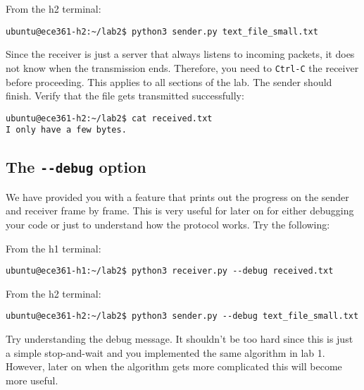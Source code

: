 \documentclass[11pt]{article}
\begin{document}
From the h2 terminal:
\begin{lstlisting}[style=ece361-shell-base, caption={}]
ubuntu@ece361-h2:~/lab2$ python3 sender.py text_file_small.txt
\end{lstlisting}

Since the receiver is just a server that always listens to incoming packets, it does not know when the transmission ends. Therefore, you need to \texttt{Ctrl-C} the receiver before proceeding. This applies to all sections of the lab.
The sender should finish. Verify that the file gets transmitted successfully:
\begin{lstlisting}[style=ece361-shell-base, caption={}]
ubuntu@ece361-h2:~/lab2$ cat received.txt
I only have a few bytes.
\end{lstlisting}


\subsection {The \texttt{-{}-debug} option}
We have provided you with a feature that prints out the progress on the sender and receiver frame by frame. This is very useful for later on for either debugging your code or just to understand how the protocol works. Try the following:

From the h1 terminal:
\begin{lstlisting}[style=ece361-shell-base, caption={}]
ubuntu@ece361-h1:~/lab2$ python3 receiver.py --debug received.txt
\end{lstlisting}

From the h2 terminal:
\begin{lstlisting}[style=ece361-shell-base, caption={}]
ubuntu@ece361-h2:~/lab2$ python3 sender.py --debug text_file_small.txt
\end{lstlisting}

Try understanding the debug message. It shouldn't be too hard since this is just a simple stop-and-wait and you implemented the same algorithm in lab 1. However, later on when the algorithm gets more complicated this will become more useful.
\end{document}
